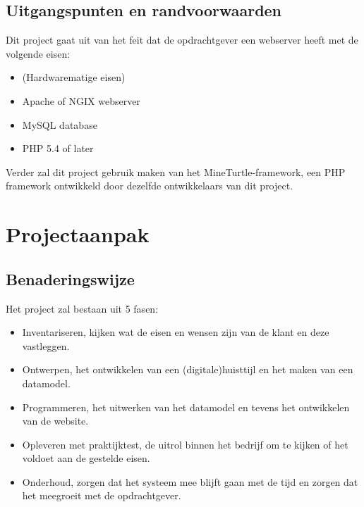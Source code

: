 \documentclass{verslag}
\begin{document}
    \subsection{Uitgangspunten en randvoorwaarden} %
    \label{sub:uitgangspunten_en_randvoorwaarden}
    Dit project gaat uit van het feit dat de opdrachtgever een webserver heeft met de volgende eisen:
        \begin{itemize}
            \item (Hardwarematige eisen)
            \item Apache of NGIX webserver
            \item MySQL database
            \item PHP 5.4 of later
        \end{itemize}
    Verder zal dit project gebruik maken van het MineTurtle-framework, een PHP framework ontwikkeld door dezelfde ontwikkelaars van dit project.


\section{Projectaanpak} %
\label{sec:projectaanpak}
    \subsection{Benaderingswijze} %
    \label{sub:benaderingswijze}
    Het project zal bestaan uit 5 fasen:
    \begin{itemize}
        \item Inventariseren, kijken wat de eisen en wensen zijn van de klant en deze vastleggen.
        \item Ontwerpen, het ontwikkelen van een (digitale)huisttijl en het maken van een datamodel.
        \item Programmeren, het uitwerken van het datamodel en tevens het ontwikkelen van de website.
        \item Opleveren met praktijktest, de uitrol binnen het bedrijf om te kijken of het voldoet aan de gestelde eisen.
        \item Onderhoud, zorgen dat het systeem mee blijft gaan met de tijd en zorgen dat het meegroeit met de opdrachtgever.
    \end{itemize}
\end{document}
